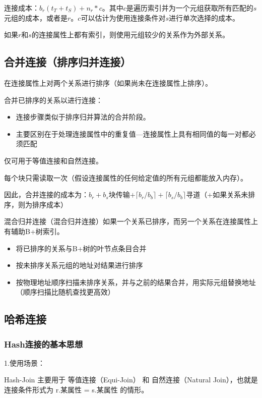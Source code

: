 连接成本：$b_r(t_T+t_S)+n_r*c$。其中$c$是遍历索引并为一个元组获取所有匹配的$s$元组的成本，或者是$r$。$c$可以估计为使用连接条件对$s$进行单次选择的成本。

如果$r$和$s$的连接属性上都有索引，则使用元组较少的关系作为外部关系。

\subsection{合并连接（排序归并连接）}

在连接属性上对两个关系进行排序（如果尚未在连接属性上排序）。

合并已排序的关系以进行连接：
\begin{itemize}
    \item 连接步骤类似于排序归并算法的合并阶段。
    \item 主要区别在于处理连接属性中的重复值---连接属性上具有相同值的每一对都必须匹配
\end{itemize}

仅可用于等值连接和自然连接。

每个块只需读取一次（假设连接属性的任何给定值的所有元组都能放入内存）。

因此，合并连接的成本为：$b_r+b_s$块传输$+\lceil b_r/b_b \rceil+\lceil b_s/b_b \rceil$寻道（+如果关系未排序，则为排序成本）

混合归并连接（混合归并连接）如果一个关系已排序，而另一个关系在连接属性上有辅助B+树索引。
\begin{itemize}
    \item 将已排序的关系与B+树的叶节点条目合并
    \item 按未排序关系元组的地址对结果进行排序
    \item 按物理地址顺序扫描未排序关系，并与之前的结果合并，用实际元组替换地址（顺序扫描比随机查找更高效）
\end{itemize}

\subsection{哈希连接}

\subsubsection{Hash连接的基本思想}

1.使用场景：

Hash-Join 主要用于 等值连接（Equi-Join） 和 自然连接（Natural Join），也就是连接条件形式为 r.某属性 = s.某属性 的情形。

